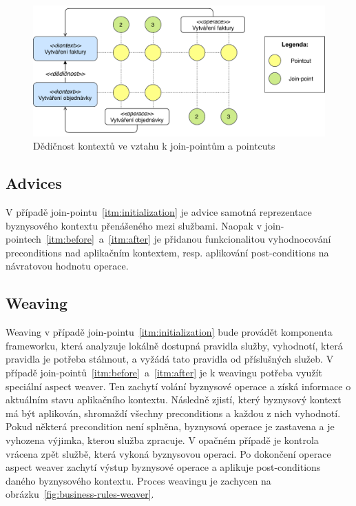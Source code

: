 \begin{figure}
    \centering
    \includegraphics[keepaspectratio=true, width=1\linewidth]{figures/context-extension.pdf}
    \caption{Dědičnost kontextů ve vztahu k join-pointům a pointcuts}
    \label{fig:context-extension}
\end{figure}

\subsection{Advices}

V případě join-pointu~\ref{itm:initialization} je advice samotná reprezentace byznysového
kontextu přenášeného mezi službami. Naopak v join-pointech~\ref{itm:before}~a~\ref{itm:after}
je přidanou funkcionalitou vyhodnocování preconditions nad aplikačním kontextem, resp. aplikování
post-conditions na návratovou hodnotu operace.

\subsection{Weaving}

Weaving v případě join-pointu~\ref{itm:initialization} bude provádět komponenta frameworku, která
analyzuje lokálně dostupná pravidla služby, vyhodnotí, která pravidla je potřeba stáhnout,
a vyžádá tato pravidla od příslušných služeb.
V případě join-pointů~\ref{itm:before}~a~\ref{itm:after} je k weavingu potřeba využít speciální aspect
weaver. Ten zachytí volání byznysové operace a získá informace o aktuálním stavu aplikačního kontextu.
Následně zjistí, který byznysový kontext má být aplikován, shromaždí všechny preconditions
a každou z nich vyhodnotí. Pokud některá precondition není splněna, byznysová operace je zastavena
a je vyhozena výjimka, kterou služba zpracuje. V opačném případě je kontrola vrácena zpět
službě, která vykoná byznysovou operaci. Po dokončení operace aspect weaver zachytí výstup byznysové
operace a aplikuje post-conditions daného byznysového kontextu. Proces weavingu je zachycen na
obrázku~\ref{fig:business-rules-weaver}.

